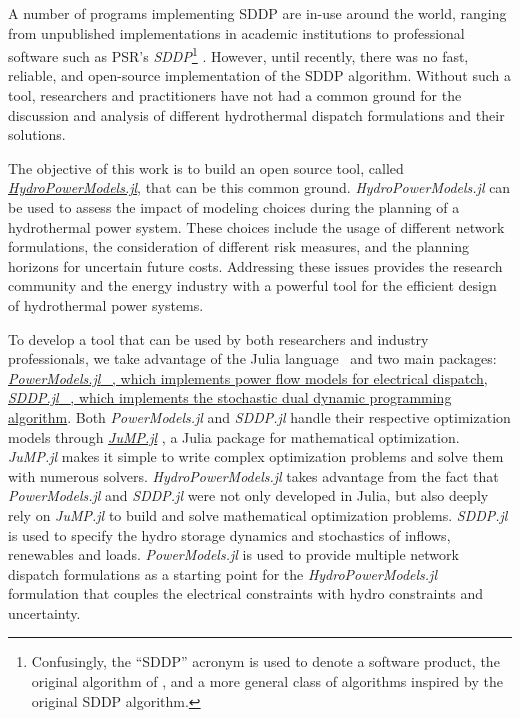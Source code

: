 \documentclass{juliacon}
\begin{document}
A number of programs implementing SDDP are in-use around the world, ranging from unpublished implementations in academic institutions to professional software such as PSR's \textit{SDDP}\footnote{Confusingly, the ``SDDP'' acronym is used to denote a software product, the original algorithm of \cite{pereira1991multi}, and a more general class of algorithms inspired by the original SDDP algorithm.} \cite{psr_software_2019}. However, until recently, there was no fast, reliable, and open-source implementation of the SDDP algorithm. Without such a tool, researchers and practitioners have not had a common ground for the discussion and analysis of different hydrothermal dispatch formulations and their solutions.

The objective of this work is to build an open source tool, called \href{https://github.com/andrewrosemberg/HydroPowerModels.jl}{\textit{HydroPowerModels.jl}}, that can be this common ground. \textit{HydroPowerModels.jl} can be used to assess the impact of modeling choices during the planning of a hydrothermal power system. These choices include the usage of different network formulations, the consideration of different risk measures, and the planning horizons for uncertain future costs. Addressing these issues provides the research community and the energy industry with a powerful tool for the efficient design of hydrothermal power systems.

To develop a tool that can be used by both researchers and industry professionals, we take advantage of the Julia language~\cite{bezanson2017julia} and two main packages: \href{https://github.com/lanl-ansi/PowerModels.jl}{\textit{PowerModels.jl} ~\cite{8442948}, which implements power flow models for electrical dispatch, \href{https://github.com/odow/SDDP.jl}{\textit{SDDP.jl}} ~\cite{dowson_sddp.jl}, which implements the stochastic dual dynamic programming algorithm}. Both \textit{PowerModels.jl} and \textit{SDDP.jl} handle their respective optimization models through \href{https://github.com/JuliaOpt/JuMP.jl}{\textit{JuMP.jl}} \cite{DunningHuchetteLubin2017}, a Julia package for mathematical optimization. \textit{JuMP.jl} makes it simple to write complex optimization problems and solve them with numerous solvers. \textit{HydroPowerModels.jl} takes advantage from the fact that \textit{PowerModels.jl} and \textit{SDDP.jl} were not only developed in Julia, but also deeply rely on \textit{JuMP.jl} to build and solve mathematical optimization problems. \textit{SDDP.jl} is used to specify the hydro storage dynamics and stochastics of inflows, renewables and loads. \textit{PowerModels.jl} is used to provide multiple network dispatch formulations as a starting point for the \textit{HydroPowerModels.jl} formulation that couples the electrical constraints with hydro constraints and uncertainty.
\end{document}
